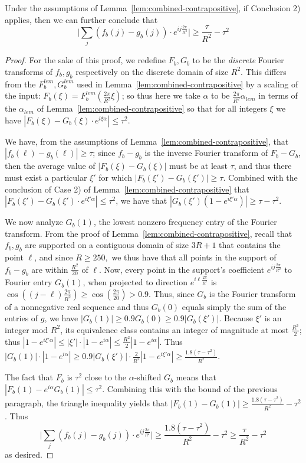 \documentclass[11pt]{article}
\theoremstyle{plain}
\begin{document}
\begin{corollary}\label{cor:shift}
Under the assumptions of Lemma~\ref{lem:combined-contrapositive}, if Conclusion 2) applies, then we can further conclude that \[\Big|\sum_{j} (f_b(j)-g_b(j))\cdot e^{ij\frac{2\pi}{R^2}}\Big|\geq \frac{\tau}{R^2}-\tau^2\]
\end{corollary}
\begin{proof}
For the sake of this proof, we redefine $F_b,G_b$ to be the \emph{discrete} Fourier transforms of $f_b,g_b$ respectively on the discrete domain of size $R^2$. This differs from the $F^{lem}_b,G^{lem}_b$ used in Lemma~\ref{lem:combined-contrapositive} by a scaling of the input: $F_b(\xi)=F^{lem}_b(\frac{2\pi}{R^2}\xi)$; so thus here we take $\alpha$ to be $\frac{2\pi}{R^2}\alpha_{lem}$ in terms of the $\alpha_{lem}$ of Lemma~\ref{lem:combined-contrapositive} so that for all integers $\xi$ we have $|F_b(\xi)-G_b(\xi)\cdot e^{i\xi \alpha}|\leq \tau^2$.




We have, from the assumptions of Lemma~\ref{lem:combined-contrapositive}, that
$|f_b(\ell)-g_b(\ell)|\geq\tau$; since $f_b-g_b$ is the inverse Fourier transform of $F_b-G_b$, then the average value of $|F_b(\xi)-G_b(\xi)|$ must be at least $\tau$, and thus there must exist a particular $\xi'$ for which $|F_b(\xi')-G_b(\xi')|\geq \tau$. Combined with the conclusion of Case 2) of Lemma~\ref{lem:combined-contrapositive} that $|F_b(\xi')-G_b(\xi')\cdot e^{i\xi' \alpha}|\leq \tau^2$, we have that $|G_b(\xi')(1-e^{i\xi'\alpha})|\geq \tau-\tau^2$.

We now analyze $G_b(1)$, the lowest nonzero frequency entry of the Fourier transform. From the proof of Lemma~\ref{lem:combined-contrapositive}, recall that $f_b,g_b$ are supported on a contiguous domain of size $3R+1$ that contains the point $\ell$, and since $R\geq 250,$ we thus have that all points in the support of $f_b-g_b$ are within $\frac{R^2}{20}$ of $\ell$. Now, every point in the support's coefficient $e^{ij\frac{2\pi}{R^2}}$ to Fourier entry $G_b(1)$, when projected to direction $e^{i\ell\frac{2\pi}{R^2}}$ is $\cos((j-\ell)\frac{2\pi}{R^2})\geq\cos(\frac{2\pi}{20})>0.9$. Thus, since $G_b$ is the Fourier transform of a nonnegative real sequence and thus $G_b(0)$ equals simply the sum of the entries of $g$, we have $|G_b(1)|\geq 0.9G_b(0)\geq 0.9 |G_b(\xi')|$. Because $\xi'$ is an integer mod $R^2$, its equivalence class contains an integer of magnitude at most $\frac{R^2}{2}$; thus $|1-e^{i\xi'\alpha}|\leq |\xi'|\cdot |1-e^{i\alpha}|\leq \frac{R^2}{2}|1-e^{i\alpha}|$.
Thus $|G_b(1)|\cdot|1-e^{i\alpha}|\geq 0.9|G_b(\xi')|\cdot\frac{2}{R^2}|1-e^{i\xi'\alpha}|\geq \frac{1.8(\tau-\tau^2)}{R^2}$.

The fact that $F_b$ is $\tau^2$ close to the $\alpha$-shifted $G_b$ means that $|F_b(1)-e^{i\alpha}G_b(1)|\leq \tau^2$. Combining this with the bound of the previous paragraph, the triangle inequality yields that $|F_b(1)-G_b(1)|\geq \frac{1.8(\tau-\tau^2)}{R^2}-\tau^2$. Thus
\[\Big|\sum_{j} (f_b(j)-g_b(j))\cdot e^{ij\frac{2\pi}{R^2}}\Big|\geq \frac{1.8(\tau-\tau^2)}{R^2}-\tau^2\geq \frac{\tau}{R^2}-\tau^2\]
as desired.

\end{proof}
\end{document}
